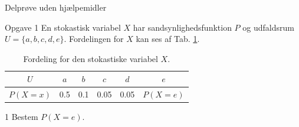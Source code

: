 \documentclass[12pt,x11names,a4paper]{article}
\begin{document}
\newpage

\begin{center}
\LARGE
Delprøve uden hjælpemidler 
\end{center}
\begin{opgavetekst}{Opgave 1}
	En stokastisk variabel $X$ har sandsynlighedsfunktion $P$ og udfaldsrum  \\
	$U = \{a,b,c,d,e\}$. Fordelingen for $X$ 
	kan ses af Tab. \ref{tab:fordeling}.
	\begin{table}[H]
		\centering
		\begin{tabular}{c|c|c|c|c|c}
			$U$ & $a$ & $b$ &  $c$ & $d$ & $e$ \\
			\hline
			$P(X=x)$ & 0.5 & 0.1 & 0.05 & 0.05 & $P(X=e)$
		\end{tabular}
		\caption{Fordeling for den stokastiske variabel $X$. }
		\label{tab:fordeling}		
	\end{table}
	\phantom{h}
\end{opgavetekst}
	\begin{delopgave}{}{1}
		Bestem $P(X=e)$.
	\end{delopgave}
\end{document}
